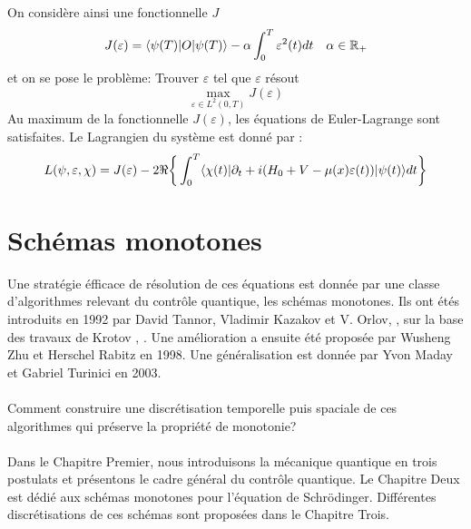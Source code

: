 On considère ainsi une fonctionnelle $J$
\begin{equation}
J(\varepsilon) = \langle \psi(T)|O|\psi(T) \rangle - \alpha \int_{0}^{T}\varepsilon^2(t)dt \quad \alpha \in \mathbb R_+
\end{equation}
et on se pose le problème: Trouver $\varepsilon$ tel que $\varepsilon$ résout
$$ \max_{\varepsilon \in L^2(0,T)} J(\varepsilon)$$
Au maximum de la fonctionnelle $J(\varepsilon)$, les équations de Euler-Lagrange sont satisfaites. Le Lagrangien du système est donné par :
\begin{equation} \label{lagrangien}
L(\psi,\varepsilon,\chi)= J(\varepsilon)\\
-2\Re \bigg\{ \int_{0}^{T}\langle \chi (t)|\partial_{t}+i(H_0+V-\mu(x)\varepsilon(t))|\psi(t) \rangle dt \bigg\}
\end{equation}
\section*{Schémas monotones}
Une stratégie éfficace de résolution de ces équations est donnée par une classe d’algorithmes relevant du contrôle quantique, les schémas monotones. Ils ont étés introduits en 1992 par David Tannor, Vladimir Kazakov et V. Orlov,  \cite{Tannor}, sur la base des travaux de Krotov \cite{Krotov1}, \cite{Krotov2}. Une amélioration a ensuite été proposée par Wusheng Zhu et Herschel Rabitz \cite{Zhu} en 1998. Une généralisation est donnée par Yvon Maday et Gabriel Turinici \cite{Maday} en 2003.\\\\

Comment construire une discrétisation temporelle puis spaciale de ces algorithmes qui préserve la propriété de monotonie?\\\\

Dans le Chapitre Premier, nous introduisons la mécanique quantique en trois postulats et présentons le cadre général du contrôle quantique. Le Chapitre Deux est dédié aux schémas monotones pour l'équation de Schrödinger.
Différentes discrétisations de ces schémas sont proposées dans le Chapitre Trois.